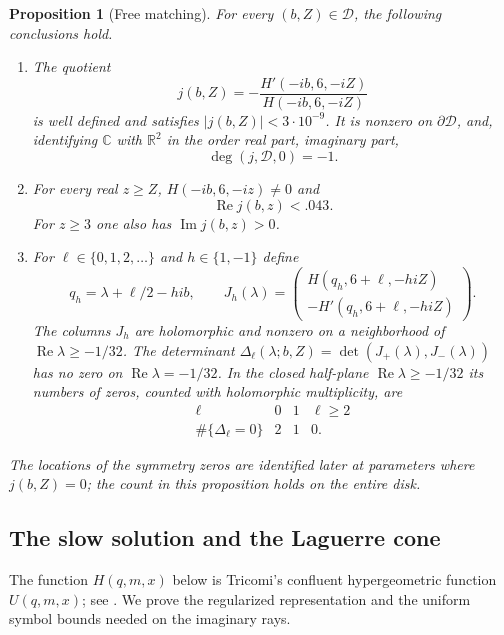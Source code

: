 \documentclass[11pt]{article}
\numberwithin{equation}{section}
\newtheorem{proposition}[theorem]{Proposition}
\theoremstyle{definition}
\theoremstyle{remark}
\begin{document}
\begin{proposition}[Free matching]\label{free:main}
For every $(b,Z)\in\mathcal D$, the following conclusions hold.
\begin{enumerate}
\item The quotient
\[
 j(b,Z)=-\frac{H'(-ib,6,-iZ)}{H(-ib,6,-iZ)}
\]
is well defined and satisfies $|j(b,Z)|<3\cdot10^{-9}$.  It is nonzero on
$\partial\mathcal D$, and, identifying $\mathbb C$ with $\mathbb R^2$ in the
order real part, imaginary part,
\[
 \deg(j,\mathcal D,0)=-1.
\]
\item For every real $z\ge Z$, $H(-ib,6,-iz)\ne0$ and
\begin{equation}\label{free:exterior-bounds}
 \operatorname{Re}j(b,z)<.043.
\end{equation}
For $z\ge3$ one also has $\operatorname{Im}j(b,z)>0$.
\item For $\ell\in\{0,1,2,\ldots\}$ and $h\in\{1,-1\}$ define
\begin{equation}\label{free:jet}
 q_h=\lambda+\ell/2-hi b,\qquad
 J_h(\lambda)=
 \begin{pmatrix}H(q_h,6+\ell,-hiZ)\\-H'(q_h,6+\ell,-hiZ)\end{pmatrix}.
\end{equation}
The columns $J_h$ are holomorphic and nonzero on a neighborhood of
$\operatorname{Re}\lambda\ge-1/32$.  The determinant
$\Delta_\ell(\lambda;b,Z)=\det(J_+(\lambda),J_-(\lambda))$ has no zero on
$\operatorname{Re}\lambda=-1/32$.  In the closed half-plane
$\operatorname{Re}\lambda\ge-1/32$ its numbers of zeros, counted with
holomorphic multiplicity, are
\[
 \begin{array}{c|ccc}
 \ell&0&1&\ell\ge2\\ \hline
 \#\{\Delta_\ell=0\}&2&1&0.
 \end{array}
\]
\end{enumerate}
The locations of the symmetry zeros are identified later at parameters
where $j(b,Z)=0$; the count in this proposition holds on the entire disk.
\end{proposition}

\subsection{The slow solution and the Laguerre cone}

The function $H(q,m,x)$ below is Tricomi's confluent hypergeometric
function $U(q,m,x)$; see \cite[Equations~13.4.4 and~13.3.22]{DLMF}.
We prove the regularized representation and the uniform symbol bounds
needed on the imaginary rays.
\end{document}
